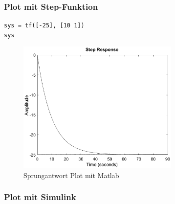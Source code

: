 \subsubsection{Plot mit Step-Funktion}
\texttt{sys = tf([-25], [10 1])}\\
\texttt{sys}\\
\begin{figure}[H]
    \centering
    \includegraphics[width=8cm]{image/PlotMitStepFunktion.eps}
    \caption{Sprungantwort Plot mit Matlab}
\end{figure}
\subsubsection{Plot mit Simulink}
